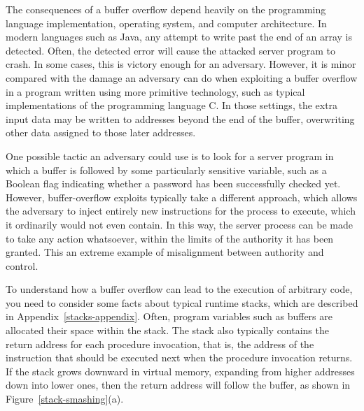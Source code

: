 The consequences of a buffer overflow depend heavily on the
programming language implementation, operating system, and computer
architecture.  In modern languages such as Java, any attempt to write
past the end of an array is detected.  Often, the detected error will
cause the attacked server program to crash.  In some cases, this is
victory enough for an adversary.  However, it is minor compared with
the damage an adversary can do when exploiting a buffer overflow in a
program written using more primitive technology, such as typical
implementations of the programming language C.  In those settings, the
extra input data may be written to addresses beyond the end of the
buffer, overwriting other data assigned to those later addresses.

One possible tactic an adversary could use is to look for a server
program in which a buffer is followed by some particularly sensitive
variable, such as a Boolean flag indicating whether a password has
been successfully checked yet.  However, buffer-overflow exploits
typically take a different approach, which allows the adversary 
to inject entirely new instructions for the process to execute, which
it ordinarily would not even contain.  In this way, the server process
can be made to take any action whatsoever, within the limits of the
authority it has been granted.  This an extreme example of
misalignment between authority and control.

To understand how a buffer overflow can lead to the execution of
arbitrary code, you need to consider some facts about typical runtime
stacks, which are described in Appendix~\ref{stacks-appendix}.  Often, program
variables such as buffers are allocated their space within the stack.
The stack also typically contains the return address for each
procedure invocation, that is, the address of the instruction that
should be executed next when the procedure invocation returns.  If the
stack grows downward in virtual memory, expanding from higher
addresses down into lower ones, then the return address will follow
the buffer, as shown in Figure~\ref{stack-smashing}(a).

